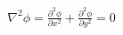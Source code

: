 \documentclass[preview]{standalone}
\begin{document}
\begin{align*}
\nabla^2 \phi = \frac{\partial^2 \phi}{\partial x^2} + \frac{\partial^2 \phi}{\partial y^2} = 0
\end{align*}
\end{document}
